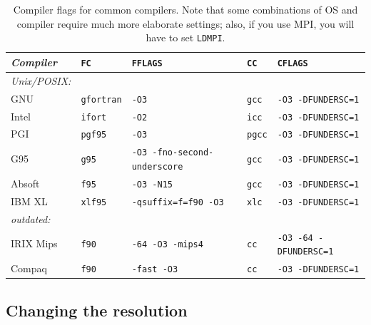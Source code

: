 \documentclass[\mydriver,12pt,twoside,notitlepage,a4paper]{article}
\begin{document}
\begin{table}
  \centering
  \caption{Compiler flags for common compilers.
    Note that some combinations of OS and compiler require much more
    elaborate settings; also, if you use MPI, you will have to set
    \texttt{LDMPI}.}
  \label{Tab-compiler-options}
  \begin{tabular}{lllll}
  \toprule
    \emph{Compiler}       & \texttt{FC}       & \texttt{FFLAGS}                     & \texttt{CC}        & \texttt{CFLAGS} \\
  \midrule
    \emph{Unix/POSIX:}     &                   &                                     &                    & \\
    GNU                   & \texttt{gfortran} & \texttt{-O3}                        & \texttt{gcc}       & \texttt{-O3 -DFUNDERSC=1}\\
    Intel                 & \texttt{ifort}    & \texttt{-O2}                        & \texttt{icc}       & \texttt{-O3 -DFUNDERSC=1}\\
    PGI                   & \texttt{pgf95}    & \texttt{-O3}                        & \texttt{pgcc}      & \texttt{-O3 -DFUNDERSC=1}\\
    G95                   & \texttt{g95}      & \texttt{-O3 -fno-second-underscore} & \texttt{gcc}       & \texttt{-O3 -DFUNDERSC=1}\\
    Absoft                & \texttt{f95}      & \texttt{-O3 -N15}                   & \texttt{gcc}       & \texttt{-O3 -DFUNDERSC=1}\\
    IBM XL                & \texttt{xlf95}    & \texttt{-qsuffix=f=f90 -O3}         & \texttt{xlc}       & \texttt{-O3 -DFUNDERSC=1}\\
  \midrule
    \emph{outdated:}       &                   &                                     &                    & \\
    IRIX Mips             & \texttt{f90}      & \texttt{-64 -O3 -mips4}             & \texttt{cc}        & \texttt{-O3 -64 -DFUNDERSC=1}\\
    Compaq                & \texttt{f90}      & \texttt{-fast -O3 }                 & \texttt{cc}        & \texttt{-O3 -DFUNDERSC=1}\\
  \bottomrule
  \end{tabular}
\end{table}


\subsection{Changing the resolution}
\end{document}
